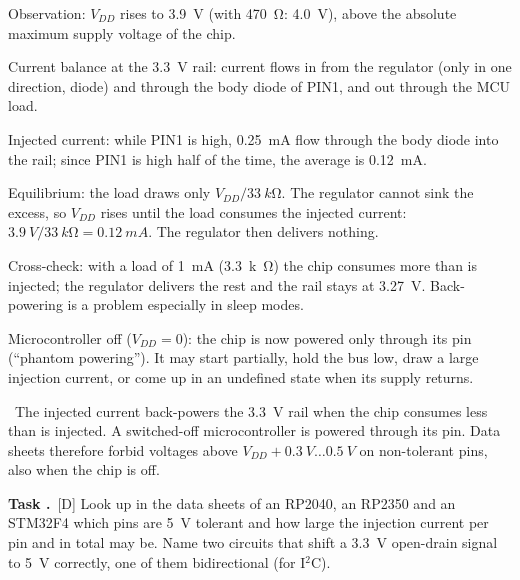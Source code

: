 \documentclass[a4paper,11pt]{article}
\newcounter{task}[section]
\renewcommand{\thetask}{\thesection.\arabic{task}}
\newcommand{\task}[1]{\par\medskip\refstepcounter{task}%
  {\sffamily\bfseries\color{rwuviolet}Task \thetask}\ {\sffamily\small\color{rwucyandark}[#1]}\quad}
\newenvironment{solution}{\begin{solbox}}{\end{solbox}}
\newcommand{\answer}{\par\smallskip{\sffamily\bfseries\color{rwuviolet}Answer:}\ }
\begin{document}
\begin{solution}
\begin{steps}
  \item Observation: $V_{DD}$ rises to \SI{3.9}{V} (with \SI{470}{\ohm}: \SI{4.0}{V}), above the absolute
        maximum supply voltage of the chip.
  \item Current balance at the \SI{3.3}{V} rail: current flows in from the regulator (only in one direction,
        diode) and through the body diode of PIN1, and out through the MCU load.
  \item Injected current: while PIN1 is high, \SI{0.25}{mA} flow through the body diode into the rail; since
        PIN1 is high half of the time, the average is \SI{0.12}{mA}.
  \item Equilibrium: the load draws only $V_{DD}/\SI{33}{k\ohm}$. The regulator cannot sink the excess, so
        $V_{DD}$ rises until the load consumes the injected current:
        $\SI{3.9}{V}/\SI{33}{k\ohm}=\SI{0.12}{mA}$. The regulator then delivers nothing.
  \item Cross-check: with a load of \SI{1}{mA} (\SI{3.3}{k\ohm}) the chip consumes more than is injected; the
        regulator delivers the rest and the rail stays at \SI{3.27}{V}. Back-powering is a problem especially in
        sleep modes.
  \item Microcontroller off ($V_{DD}=0$): the chip is now powered only through its pin (``phantom powering'').
        It may start partially, hold the bus low, draw a large injection current, or come up in an undefined
        state when its supply returns.
\end{steps}
\answer The injected current back-powers the \SI{3.3}{V} rail when the chip consumes less than is injected. A
switched-off microcontroller is powered through its pin. Data sheets therefore forbid voltages above
$V_{DD}+\SI{0.3}{V}\ldots\SI{0.5}{V}$ on non-tolerant pins, also when the chip is off.
\end{solution}

\task{D} Look up in the data sheets of an RP2040, an RP2350 and an STM32F4 which pins are \SI{5}{V} tolerant
and how large the injection current per pin and in total may be. Name two circuits that shift a
\SI{3.3}{V} open-drain signal to \SI{5}{V} correctly, one of them bidirectional (for I$^2$C).
\end{document}
